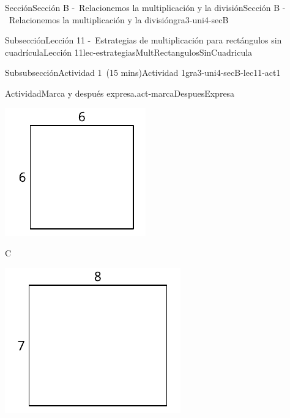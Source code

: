 \documentclass[oneside,10pt,]{article}
\begin{document}
\begin{sectionptx}{Sección}{Sección B -~Relacionemos la multiplicación y la división}{}{Sección B -~Relacionemos la multiplicación y la división}{}{}{gra3-uni4-secB}
\begin{subsectionptx}{Subsección}{Lección 11 -~Estrategias de multiplicación para rectángulos sin cuadrícula}{}{Lección 11}{}{}{lec-estrategiasMultRectangulosSinCuadricula}
\begin{subsubsectionptx}{Subsubsección}{Actividad 1~(15 mins)}{}{Actividad 1}{}{}{gra3-uni4-secB-lec11-act1}
\begin{activity}{Actividad}{Marca y después expresa.}{act-marcaDespuesExpresa}
\begin{sidebyside}{3}{0}{0}{0}
\begin{sbspanel}{0.261}
\includegraphics[width=\linewidth]{external/svg-source/tikz-file-153085.pdf}
\end{sbspanel}%
\begin{sbspanel}{0.348}%
C%
\par
\includegraphics[width=\linewidth]{external/svg-source/tikz-file-153086.pdf}
\end{sbspanel}%
\end{sidebyside}%
\par\smallskip%

\end{activity}
\end{subsubsectionptx}
\end{subsectionptx}
\end{sectionptx}
\end{document}
